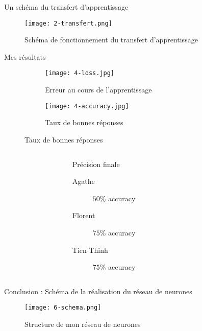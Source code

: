 \begin{frame}{Un schéma du transfert d'apprentissage}
	\begin{figure}
		\texttt{[image: 2-transfert.png]}
		\caption{Schéma de fonctionnement du transfert d'apprentissage}
	\end{figure}
\end{frame}


\begin{frame}{Mes résultats}
	\begin{figure}
		\begin{subfigure}[]{0.49\textwidth}
			\texttt{[image: 4-loss.jpg]}
			\caption{Erreur au cours de l'apprentissage}
		\end{subfigure}
		\begin{subfigure}[]{0.49\textwidth}
			\texttt{[image: 4-accuracy.jpg]}
			\caption{Taux de bonnes réponses}
		\end{subfigure}
	\end{figure}
	\begin{columns}[T]
		\begin{column}{0.25\textwidth}
		\end{column}
		\begin{column}[]{0.50\textwidth}
			\begin{block}{Précision finale}
				\begin{description}
					\item[Agathe]  $50\%$ accuracy
					\item[Florent]  $75\%$ accuracy
					\item[Tien-Thinh]  $75\%$ accuracy
				\end{description}
			\end{block}
		\end{column}
		\begin{column}{0.25\textwidth}
		\end{column}
	\end{columns}
\end{frame}



\begin{frame}{Conclusion : Schéma de la réalisation du réseau de neurones}
	\begin{figure}
		\centering
		\texttt{[image: 6-schema.png]}
		\caption{Structure de mon réseau de neurones}
	\end{figure}
\end{frame}


